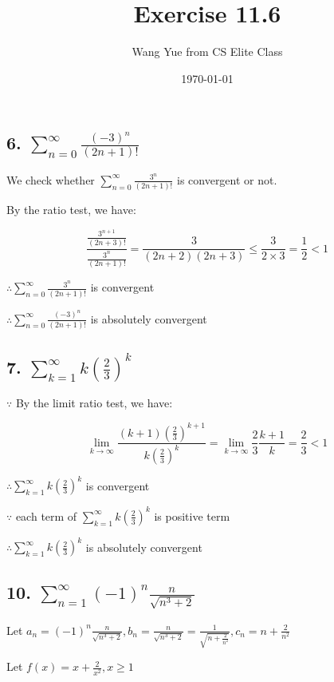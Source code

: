 \documentclass{article}
\begin{document}
    \title{Exercise 11.6}
    \author{Wang Yue from CS Elite Class}
    \date{\today}

    \maketitle

    \subsection*{6. $\sum_{n=0}^\infty \frac{(-3)^n}{(2n+1)!}$}

    We check whether $\sum_{n=0}^\infty \frac{3^n}{(2n+1)!}$ is convergent or not.

    By the ratio test, we have:

    $$\frac{\frac{3^{n+1}}{(2n+3)!}}{\frac{3^n}{(2n+1)!}} = \frac{3}{(2n+2)(2n+3)} \leq \frac{3}{2 \times 3} = \frac 1 2 < 1$$

    $\therefore \sum_{n=0}^\infty \frac{3^n}{(2n+1)!}$ is convergent

    $\therefore \sum_{n=0}^\infty \frac{(-3)^n}{(2n+1)!}$ is absolutely convergent

    \subsection*{7. $\sum_{k=1}^\infty k(\frac 2 3)^k$}

    $\because$ By the limit ratio test, we have:

    $$\lim_{k\to\infty} \frac{(k+1)(\frac 2 3)^{k+1}}{k(\frac 2 3)^k} = \lim_{k \to \infty} \frac 2 3 \frac{k+1}{k} = \frac 2 3 < 1$$

    $\therefore \sum_{k=1}^\infty k(\frac 2 3)^k$ is convergent

    $\because$ each term of $\sum_{k=1}^\infty k(\frac 2 3)^k$ is positive term

    $\therefore \sum_{k=1}^\infty k(\frac 2 3)^k$ is absolutely convergent

    \subsection*{10. $\sum_{n=1}^\infty (-1)^n \frac{n}{\sqrt{n^3+2}}$}

    Let $a_n = (-1)^n \frac{n}{\sqrt{n^3 + 2}}, b_n = \frac{n}{\sqrt{n^3 + 2}} = \frac{1}{\sqrt{n + \frac{2}{n^2}}}, c_n = n + \frac{2}{n^2}$

    Let $f(x) = x + \frac{2}{x^2}, x \geq 1$
\end{document}
